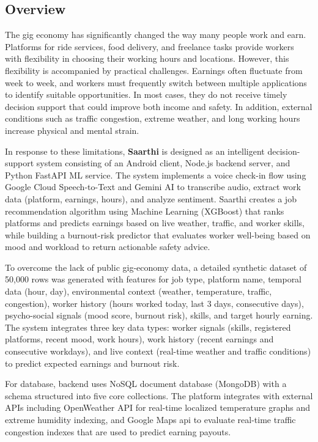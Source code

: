 \documentclass[12pt,a4paper]{article}
\begin{document}
\subsection{Overview}
\par\noindent
The gig economy has significantly changed the way many people work and earn. Platforms for ride services, food delivery, and freelance tasks provide workers with flexibility in choosing their working hours and locations. However, this flexibility is accompanied by practical challenges. Earnings often fluctuate from week to week, and workers must frequently switch between multiple applications to identify suitable opportunities. In most cases, they do not receive timely decision support that could improve both income and safety. In addition, external conditions such as traffic congestion, extreme weather, and long working hours increase physical and mental strain.
\vspace{0.4cm}
\par\noindent
In response to these limitations, \textbf{Saarthi} is designed as an intelligent decision-support system consisting of an Android client, Node.js backend server, and Python FastAPI ML service. The system implements a voice check-in flow using Google Cloud Speech-to-Text and Gemini AI to transcribe audio, extract work data (platform, earnings, hours), and analyze sentiment. Saarthi creates a job recommendation algorithm using Machine Learning (XGBoost) that ranks platforms and predicts earnings based on live weather, traffic, and worker skills, while building a burnout-risk predictor that evaluates worker well-being based on mood and workload to return actionable safety advice.
\vspace{0.4cm}
\par\noindent
To overcome the lack of public gig-economy data, a detailed synthetic dataset of 50,000 rows was generated with features for job type, platform name, temporal data (hour, day), environmental context (weather, temperature, traffic, congestion), worker history (hours worked today, last 3 days, consecutive days), psycho-social signals (mood score, burnout risk), skills, and target hourly earning. The system integrates three key data types: worker signals (skills, registered platforms, recent mood, work hours), work history (recent earnings and consecutive workdays), and live context (real-time weather and traffic conditions) to predict expected earnings and burnout risk.
\vspace{0.4cm}
\par\noindent
For database, backend uses NoSQL document database (MongoDB) with a schema structured into five core collections. The platform integrates with external APIs including OpenWeather API for real-time localized temperature graphs and extreme humidity indexing, and Google Maps api to evaluate real-time traffic congestion indexes that are used to predict earning payouts.
\end{document}
